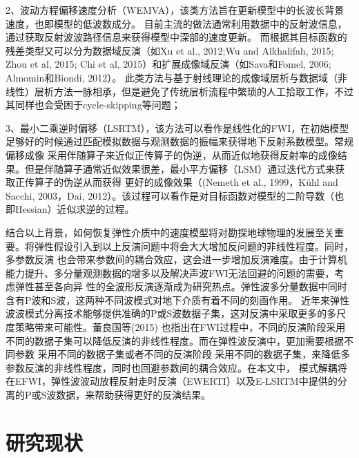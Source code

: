 2、波动方程偏移速度分析（WEMVA），该类方法旨在更新模型中的长波长背景速度，也即模型的低波数成分。
目前主流的做法通常利用数据中的反射波信息，通过获取反射波波路径信息来获得模型中深部的速度更新。
而根据其目标函数的残差类型又可以分为数据域反演（如Xu et al., 2012\cite{xu:2012};Wu and Alkhalifah,
2015\cite[]{Wu2015b}; Zhou et al, 
2015\cite[]{zhou:2015}; Chi et al, 2015\cite{chi2015}）和扩展成像域反演（如Sava和Fomel, 2006\cite{Sava2006}; Almomin和Biondi, 2012\cite{Almomin2012}）。
此类方法与基于射线理论的成像域层析与数据域（非线性）层析方法一脉相承，但是避免了传统层析流程中繁琐的人工拾取工作，不过其同样也会受困于cycle-skipping等问题；

3、最小二乘逆时偏移（LSRTM），该方法可以看作是线性化的FWI，在初始模型足够好的时候通过匹配模拟数据与观测数据的振幅来获得地下反射系数模型。常规偏移成像
采用伴随算子来近似正传算子的伪逆，从而近似地获得反射率的成像结果。但是伴随算子通常近似效果很差，最小平方偏移（LSM）通过迭代方式来获取正传算子的伪逆从而获得
更好的成像效果（(Nemeth et al., 1999\cite{Nemeth1999}，Kühl and Sacchi\cite{KuehlEtAl2003}, 2003，Dai,
2012\cite{DaiEtAl2012}）。该过程可以看作是对目标函数对模型的二阶导数（也即Hessian）近似求逆的过程。

结合以上背景，如何恢复弹性介质中的速度模型将对勘探地球物理的发展至关重要。将弹性假设引入到以上反演问题中将会大大增加反问题的非线性程度。同时，多参数反演
也会带来参数间的耦合效应，这会进一步增加反演难度。由于计算机能力提升、多分量观测数据的增多以及解决声波FWI无法回避的问题的需要，考虑弹性甚至各向异
性的全波形反演逐渐成为研究热点。弹性波多分量数据中同时含有P波和S波，这两种不同波模式对地下介质有着不同的刻画作用。
近年来弹性波波模式分离技术能够提供准确的P或S波数据子集，这对反演中采取更多的多尺度策略带来可能性。董良国等(2015)\cite{董良国2015}
也指出在FWI过程中，不同的反演阶段采用不同的数据子集可以降低反演的非线性程度。而在弹性波反演中，更加需要根据不同参数
采用不同的数据子集或者不同的反演阶段
采用不同的数据子集，来降低多参数反演的非线性程度，同时也回避参数间的耦合效应。在本文中，
模式解耦将在EFWI，弹性波波动放程反射走时反演（EWERTI）以及E-LSRTM中提供的分离的P或S波数据，来帮助获得更好的反演结果。
\section{研究现状}
